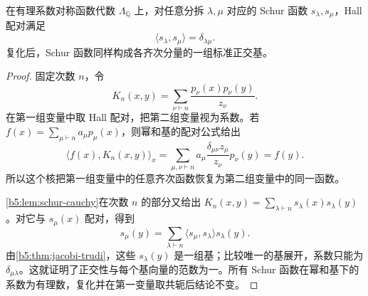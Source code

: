 \begin{proposition}\label{b5:prop:schur-orthonormal}
	在有理系数对称函数代数 \(\Lambda_{\mathbb Q}\) 上，对任意分拆 \(\lambda,\mu\) 对应的 Schur 函数 \(s_\lambda,s_\mu\)，Hall 配对满足
	\[
		\langle s_\lambda,s_\mu\rangle=\delta_{\lambda\mu}.
	\]
	复化后，Schur 函数同样构成各齐次分量的一组标准正交基。
\end{proposition}
\begin{proof}
	固定次数 \(n\)，令
	\[
		K_n(x,y)=\sum_{\nu\vdash n}\frac{p_\nu(x)p_\nu(y)}{z_\nu}.
	\]
	在第一组变量中取 Hall 配对，把第二组变量视为系数。若 \(f(x)=\sum_{\mu\vdash n}a_\mu p_\mu(x)\)，则幂和基的配对公式给出
	\[
		\langle f(x),K_n(x,y)\rangle_x =\sum_{\mu,\nu\vdash n} a_\mu\frac{\delta_{\mu\nu}z_\mu}{z_\nu}p_\nu(y) =f(y).
	\]
	所以这个核把第一组变量中的任意齐次函数恢复为第二组变量中的同一函数。

	\cref{b5:lem:schur-cauchy}在次数 \(n\) 的部分又给出 \(K_n(x,y)=\sum_{\lambda\vdash n}s_\lambda(x)s_\lambda(y)\)。对它与 \(s_\mu(x)\) 配对，得到
	\[
		s_\mu(y)=\sum_{\lambda\vdash n} \langle s_\mu,s_\lambda\rangle s_\lambda(y).
	\]
	由\cref{b5:thm:jacobi-trudi}，这些 \(s_\lambda(y)\) 是一组基；比较唯一的基展开，系数只能为 \(\delta_{\mu\lambda}\)。这就证明了正交性与每个基向量的范数为一。所有 Schur 函数在幂和基下的系数为有理数，复化并在第一变量取共轭后结论不变。
\end{proof}
